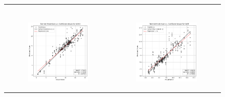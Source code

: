 \begin{figure}
{\begin{tabular}{cc}
\begin{subfigure}{0.5\textwidth}
            \end{subfigure} \\
            \begin{subfigure}{0.5\textwidth}
                \includegraphics[width=\textwidth]{images/one_to_one/svr/Al2O3.png}
            \end{subfigure} & \hspace{3cm}
            \begin{subfigure}{0.5\textwidth}
                \includegraphics[width=\textwidth]{images/one_to_one/svr/FeOT.png}

\end{subfigure}
\end{tabular}}
\end{figure}
